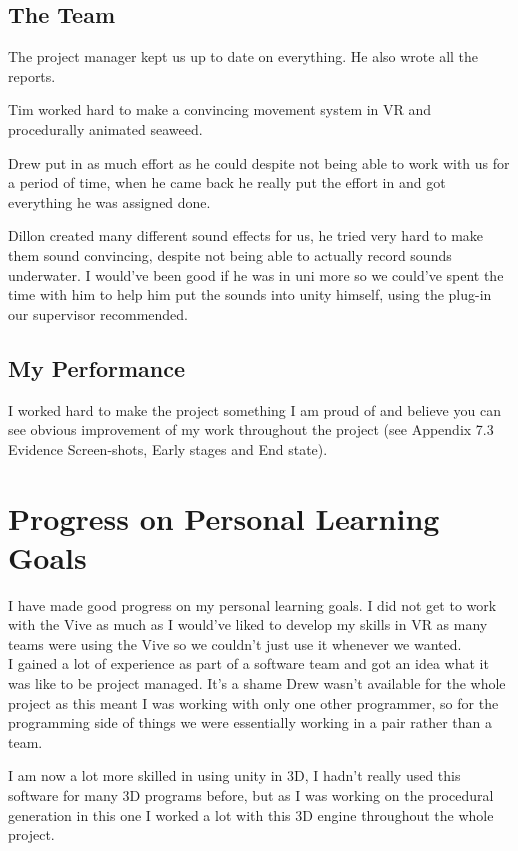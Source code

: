 \documentclass[10pt, a4paper]{article}
\begin{document}
	\subsection{The Team}
	
	The project manager kept us up to date on everything. He also wrote all the reports.
	
	Tim worked hard to make a convincing movement system in VR and procedurally animated seaweed.
	
	Drew put in as much effort as he could despite not being able to work with us for a period of time, when he came back he really put the effort in and got everything he was assigned done.
	
	Dillon created many different sound effects for us, he tried very hard to make them sound convincing, despite not being able to actually record sounds underwater. I would've been good if he was in uni more so we could've spent the time with him to help him put the sounds into unity himself, using the plug-in our supervisor recommended.
	
	
	\subsection{My Performance}
	
	I worked hard to make the project something I am proud of and believe you can see obvious improvement of my work throughout the project (see Appendix 7.3 Evidence Screen-shots, Early stages and End state).\\
		
	\section{Progress on Personal Learning Goals}
	
	I have made good progress on my personal learning goals. I did not get to work with the Vive as much as I would've liked to develop my skills in VR as many teams were using the Vive so we couldn't just use it whenever we wanted.\\
	
	I gained a lot of experience as part of a software team and got an idea what it was like to be project managed. It's a shame Drew wasn't available for the whole project as this meant I was working with only one other programmer, so for the programming side of things we were essentially working in a pair rather than a team.
	
	I am now a lot more skilled in using unity in 3D, I hadn't really used this software for many 3D programs before, but as I was working on the procedural generation in this one I worked a lot with this 3D engine throughout the whole project.
	
\end{document}
